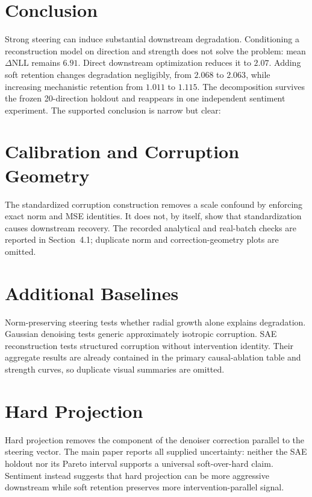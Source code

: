 \documentclass[11pt,twocolumn]{article}
\newcommand{\dNLL}{\Delta\mathrm{NLL}}
\begin{document}
\section{Conclusion}
Strong steering can induce substantial downstream degradation. Conditioning a reconstruction model on direction and strength does not solve the problem: mean $\dNLL$ remains $6.91$. Direct downstream optimization reduces it to $2.07$. Adding soft retention changes degradation negligibly, from $2.068$ to $2.063$, while increasing mechanistic retention from $1.011$ to $1.115$. The decomposition survives the frozen 20-direction holdout and reappears in one independent sentiment experiment. The supported conclusion is narrow but clear:
\begin{center}
\end{center}


\setlength{\bibsep}{0pt}
{\footnotesize}

\clearpage
\appendix
\section{Calibration and Corruption Geometry}
The standardized corruption construction removes a scale confound by enforcing exact norm and MSE identities. It does not, by itself, show that standardization causes downstream recovery. The recorded analytical and real-batch checks are reported in Section~4.1; duplicate norm and correction-geometry plots are omitted.

\section{Additional Baselines}
Norm-preserving steering tests whether radial growth alone explains degradation. Gaussian denoising tests generic approximately isotropic corruption. SAE reconstruction tests structured corruption without intervention identity. Their aggregate results are already contained in the primary causal-ablation table and strength curves, so duplicate visual summaries are omitted.

\section{Hard Projection}
Hard projection removes the component of the denoiser correction parallel to the steering vector. The main paper reports all supplied uncertainty: neither the SAE holdout nor its Pareto interval supports a universal soft-over-hard claim. Sentiment instead suggests that hard projection can be more aggressive downstream while soft retention preserves more intervention-parallel signal.
\end{document}
